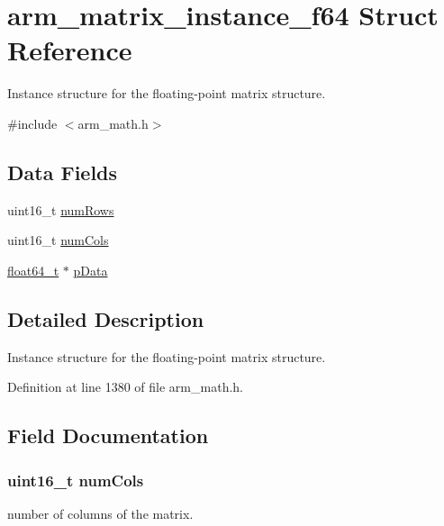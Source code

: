 \hypertarget{structarm__matrix__instance__f64}{}\section{arm\+\_\+matrix\+\_\+instance\+\_\+f64 Struct Reference}
\label{structarm__matrix__instance__f64}


Instance structure for the floating-\/point matrix structure.  




{\ttfamily \#include $<$arm\+\_\+math.\+h$>$}

\subsection*{Data Fields}
\begin{DoxyCompactItemize}
\item 
uint16\+\_\+t \hyperlink{structarm__matrix__instance__f64_a1bcf80ccdc2acc29198f1592ae300390}{num\+Rows}
\item 
uint16\+\_\+t \hyperlink{structarm__matrix__instance__f64_a4bb5ec0d13eb4c9cf887aa8366a44117}{num\+Cols}
\item 
\hyperlink{arm__math_8h_ac55f3ae81b5bc9053760baacf57e47f4}{float64\+\_\+t} $\ast$ \hyperlink{structarm__matrix__instance__f64_aa7a4c9839c31e933360ef3a3167b9877}{p\+Data}
\end{DoxyCompactItemize}


\subsection{Detailed Description}
Instance structure for the floating-\/point matrix structure. 

Definition at line 1380 of file arm\+\_\+math.\+h.



\subsection{Field Documentation}
\subsubsection[{\texorpdfstring{num\+Cols}{numCols}}]{\setlength{\rightskip}{0pt plus 5cm}uint16\+\_\+t num\+Cols}\hypertarget{structarm__matrix__instance__f64_a4bb5ec0d13eb4c9cf887aa8366a44117}{}\label{structarm__matrix__instance__f64_a4bb5ec0d13eb4c9cf887aa8366a44117}
number of columns of the matrix. 


